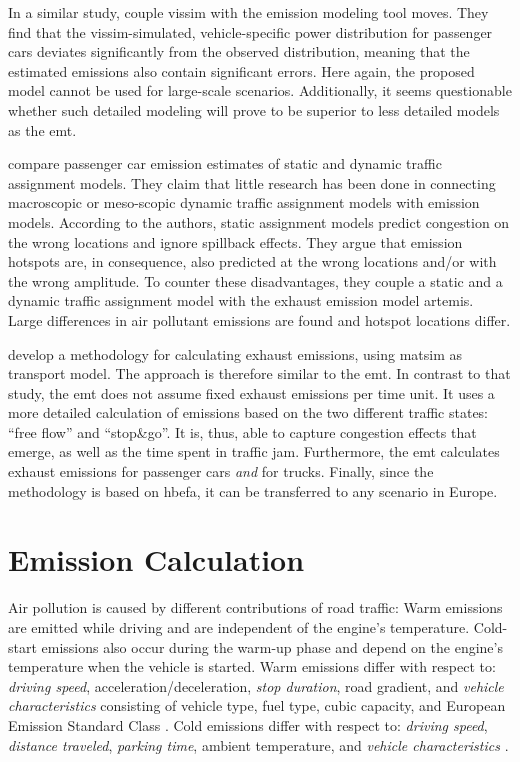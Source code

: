 In a similar study, \citet{SongEtAl_TRR_2012} couple \acrshort{vissim} with the emission modeling tool \acrshort{moves}. They find 
that the \acrshort{vissim}-simulated, vehicle-specific power distribution for 
passenger cars deviates significantly from the observed distribution, meaning that the estimated emissions also contain significant errors. Here 
again, the proposed model cannot be used for large-scale scenarios. Additionally, it seems questionable whether such detailed 
modeling will prove to be superior to less detailed models as the \gls{emt}.

\citet{WismansEtAl_TRB_2013} compare passenger car emission 
estimates of static and dynamic traffic assignment models. They claim that 
little research has been done in connecting macroscopic or meso-scopic dynamic 
traffic assignment models with emission models.
%
According to the authors, static assignment models predict congestion on the 
wrong locations and ignore spillback effects. They argue that emission 
hotspots are, in consequence, also predicted at the wrong locations and/or 
with the wrong amplitude.
%
To counter these disadvantages, they couple a static and a dynamic traffic assignment model with 
the exhaust emission model \acrshort{artemis}. Large differences in air 
pollutant emissions are found and hotspot locations differ.

\citet{HatzopoulouMiller_TransResD_2010} develop a methodology for 
calculating exhaust emissions, using \gls{matsim} as transport 
model. The approach is therefore similar to the \gls{emt}.
%
In contrast to that study, the \gls{emt} does not assume fixed exhaust 
emissions per time unit. It uses a more detailed calculation of emissions based 
on the two different traffic states: ``free flow'' and ``stop\&go''. It is, thus, 
able to capture congestion effects that emerge, as well as the time spent 
in traffic jam. 
Furthermore, the \gls{emt} calculates exhaust emissions for passenger cars 
\emph{and} for trucks. Finally, since the methodology is based on \gls{hbefa}, 
it can be transferred to any scenario in Europe.

\section{Emission Calculation}
\label{ch:emissions:overview}
%
Air pollution is caused by different contributions of road traffic:
%
Warm emissions are emitted while driving and are independent of the engine's temperature.
%
Cold-start emissions also occur during the warm-up phase and depend on the engine's temperature when the vehicle is started.
%
Warm emissions differ with respect to: \emph{driving speed}, acceleration/deceleration, \emph{stop duration}, road gradient, and \emph{vehicle characteristics} consisting of vehicle type, fuel type, cubic capacity, and European Emission Standard Class \citep{AndreRapone_Atmos_2009}.
%
Cold emissions differ with respect to: \emph{driving speed}, \emph{distance traveled}, \emph{parking time}, ambient temperature, and \emph{vehicle characteristics} \citep{WeilenmannEtAl_Atmos_2009}.

